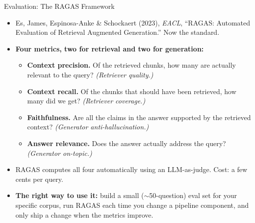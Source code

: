 \begin{frame}{Evaluation: The RAGAS Framework}
\begin{itemize}
\item Es, James, Espinosa-Anke \& Schockaert (2023), \emph{EACL}, ``RAGAS: Automated Evaluation of Retrieval Augmented Generation.'' Now the standard.

\medskip
\item \textbf{Four metrics, two for retrieval and two for generation:}
\begin{itemize}
    \item \textbf{Context precision.} Of the retrieved chunks, how many are actually relevant to the query? \emph{(Retriever quality.)}
    \medskip
    \item \textbf{Context recall.} Of the chunks that should have been retrieved, how many did we get? \emph{(Retriever coverage.)}
    \medskip
    \item \textbf{Faithfulness.} Are all the claims in the answer supported by the retrieved context? \emph{(Generator anti-hallucination.)}
    \medskip
    \item \textbf{Answer relevance.} Does the answer actually address the query? \emph{(Generator on-topic.)}
\end{itemize}

\medskip
\item RAGAS computes all four automatically using an LLM-as-judge. Cost: a few cents per query.

\medskip
\item \textbf{The right way to use it:} build a small ($\sim$50-question) eval set for your specific corpus, run RAGAS each time you change a pipeline component, and only ship a change when the metrics improve.
\end{itemize}
\end{frame}

